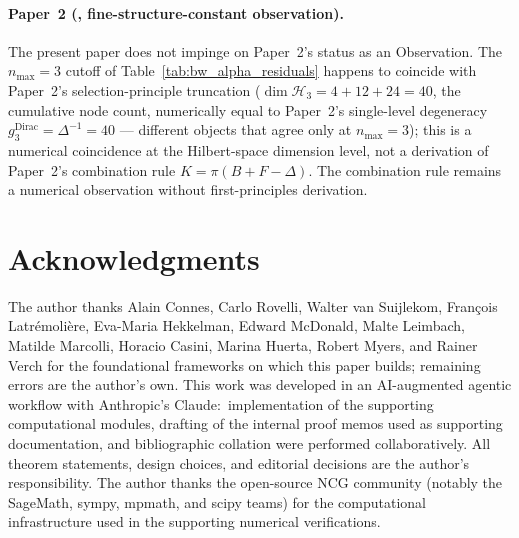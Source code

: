 \documentclass[11pt,a4paper]{article}
\theoremstyle{plain}
\theoremstyle{definition}
\newcommand{\nmax}{n_{\max}}
\newcommand{\Hilb}{\mathcal{H}}
\begin{document}
\paragraph{Paper~2 (\cite{paper2}, fine-structure-constant
observation).}
The present paper does not impinge on Paper~2's status as an
Observation. The $\nmax = 3$ cutoff of
Table~\ref{tab:bw_alpha_residuals} happens to coincide with Paper~2's
selection-principle truncation ($\dim \Hilb_3 = 4 + 12 + 24 = 40$, the
cumulative node count, numerically equal to Paper~2's single-level
degeneracy $g_3^{\mathrm{Dirac}} = \Delta^{-1} = 40$ --- different objects
that agree only at $\nmax = 3$); this is a numerical coincidence at the
Hilbert-space dimension level, not a derivation of Paper~2's combination rule
$K = \pi(B + F - \Delta)$. The combination rule remains a numerical
observation without first-principles derivation.

\section*{Acknowledgments}

The author thanks Alain Connes, Carlo Rovelli, Walter van Suijlekom,
Fran\c{c}ois Latr\'emoli\`ere, Eva-Maria Hekkelman, Edward McDonald,
Malte Leimbach, Matilde Marcolli, Horacio Casini, Marina Huerta,
Robert Myers, and Rainer Verch for the foundational frameworks
on which this paper builds; remaining errors are the author's own.
This work was developed in an AI-augmented agentic workflow with
Anthropic's Claude:\ implementation of the supporting computational
modules, drafting of the internal proof memos used as supporting
documentation, and bibliographic collation were performed
collaboratively. All theorem statements, design choices, and
editorial decisions are the author's responsibility. The author
thanks the open-source NCG community (notably the SageMath, sympy,
mpmath, and scipy teams) for the computational infrastructure used in
the supporting numerical verifications.
\end{document}
